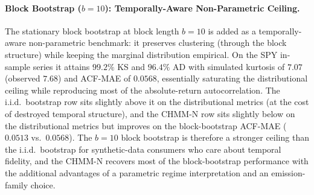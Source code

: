 \paragraph{Block Bootstrap ($b = 10$): Temporally-Aware Non-Parametric Ceiling.}
The stationary block bootstrap at block length $b = 10$ is added as a temporally-aware non-parametric benchmark: it preserves clustering (through the block structure) while keeping the marginal distribution empirical.
On the SPY in-sample series it attains $99.2\%$ KS and $96.4\%$ AD with simulated kurtosis of $7.07$ (observed $7.68$) and ACF-MAE of $0.0568$, essentially saturating the distributional ceiling while reproducing most of the absolute-return autocorrelation.
The i.i.d.\ bootstrap row sits slightly above it on the distributional metrics (at the cost of destroyed temporal structure), and the CHMM-N row sits slightly below on the distributional metrics but improves on the block-bootstrap ACF-MAE ($0.0513$ vs.\ $0.0568$).
The $b = 10$ block bootstrap is therefore a stronger ceiling than the i.i.d.\ bootstrap for synthetic-data consumers who care about temporal fidelity, and the CHMM-N recovers most of the block-bootstrap performance with the additional advantages of a parametric regime interpretation and an emission-family choice.

